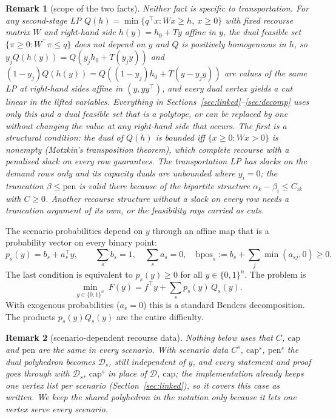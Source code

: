 \documentclass[11pt]{article}
\newtheorem{remark}{Remark}
\newcommand{\bpos}{\mathrm{bpos}}
\newcommand{\capa}{\mathrm{cap}}
\newcommand{\pen}{\mathrm{pen}}
\newcommand{\D}{\mathcal{D}}
\newcommand{\T}{^{\top}}
\begin{document}
\begin{remark}[scope of the two facts]\label{rem:scope}
Neither fact is specific to transportation. For any second-stage LP $Q(h) = \min\{q\T x : Wx\ge h,\ x\ge0\}$
with fixed recourse matrix $W$ and right-hand side $h(y) = h_0 + Ty$ affine in $y$, the dual feasible set
$\{\pi\ge0 : W\T\pi\le q\}$ does not depend on $y$ and $Q$ is positively homogeneous in $h$, so
$y_jQ(h(y)) = Q(y_jh_0 + T(y_jy))$ and $(1-y_j)Q(h(y)) = Q((1-y_j)h_0 + T(y - y_jy))$ are values of the same LP at
right-hand sides affine in $(y, yy\T)$, and every dual vertex yields a cut linear in the lifted variables. Everything
in Sections~\ref{sec:linked}--\ref{sec:decomp} uses only this and a dual feasible set that is a polytope, or can be
replaced by one without changing the value at any right-hand side that occurs. The first is a structural condition:
the dual of $Q(h)$ is bounded iff $\{x\ge0 : Wx > 0\}$ is nonempty (Motzkin's transposition theorem), which complete
recourse with a penalised slack on every row guarantees. The transportation LP has slacks on the demand rows only and
its capacity duals are unbounded where $y_i = 0$; the truncation $\beta\le\pen$ is valid there because of the
bipartite structure $\alpha_k - \beta_i\le C_{ik}$ with $C\ge0$. Another recourse structure without a slack on every
row needs a truncation argument of its own, or the feasibility rays carried as cuts.
\end{remark}

The scenario probabilities depend on $y$ through an affine map that is a probability vector on every binary point:
\begin{equation}\label{eq:p}
p_s(y) = b_s + a_s\T y,\qquad \sum_s b_s = 1,\quad \sum_s a_s = 0,\quad
\bpos_s := b_s + \sum_j \min(a_{sj},0) \ge 0 .
\end{equation}
The last condition is equivalent to $p_s(y)\ge 0$ for all $y\in\{0,1\}^n$. The problem is
\begin{equation}\label{eq:F}
\min_{y\in\{0,1\}^n}\ F(y) = f\T y + \sum_s p_s(y)\,Q_s(y).
\end{equation}
With exogenous probabilities ($a_s = 0$) this is a standard Benders decomposition. The products $p_s(y)Q_s(y)$ are the
entire difficulty.

\begin{remark}[scenario-dependent recourse data]
Nothing below uses that $C$, $\capa$ and $\pen$ are the same in every scenario. With scenario data $C^s$, $\capa^s$,
$\pen^s$ the dual polyhedron becomes $\D_s$, still independent of $y$, and every statement and proof goes through with
$\D_s$, $\capa^s$ in place of $\D$, $\capa$; the implementation already keeps one vertex list per scenario
(Section~\ref{sec:linked}), so it covers this case as written. We keep the shared polyhedron in the notation only
because it lets one vertex serve every scenario.
\end{remark}
\end{document}
